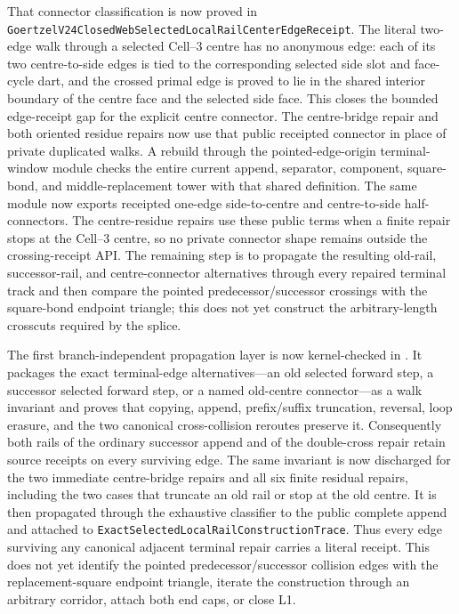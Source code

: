 \documentclass[11pt]{article}
\theoremstyle{definition}
\begin{document}
That connector classification is now proved in
\texttt{GoertzelV24ClosedWebSelectedLocalRailCenterEdgeReceipt}.  The literal
two-edge walk through a selected Cell--3 centre has no anonymous edge: each
of its two centre-to-side edges is tied to the corresponding selected side
slot and face-cycle dart, and the crossed primal edge is proved to lie in the
shared interior boundary of the centre face and the selected side face.  This
closes the bounded edge-receipt gap for the explicit centre connector.  The
centre-bridge repair and both oriented residue repairs now use that public
receipted connector in place of private duplicated walks.  A rebuild through
the pointed-edge-origin terminal-window module checks the entire current
append, separator, component, square-bond, and middle-replacement tower with
that shared definition.  The same module now exports receipted one-edge
side-to-centre and centre-to-side half-connectors.  The centre-residue repairs
use these public terms when a finite repair stops at the Cell--3 centre, so no
private connector shape remains outside the crossing-receipt API.  The
remaining step is to propagate the resulting old-rail, successor-rail, and
centre-connector alternatives through every repaired terminal track and then
compare the pointed predecessor/successor crossings with the square-bond
endpoint triangle; this does not yet construct the arbitrary-length crosscuts
required by the splice.

The first branch-independent propagation layer is now kernel-checked in
.
It packages the exact terminal-edge alternatives---an old selected forward
step, a successor selected forward step, or a named old-centre connector---as
a walk invariant and proves that copying, append, prefix/suffix truncation,
reversal, loop erasure, and the two canonical cross-collision reroutes
preserve it.  Consequently both rails of the ordinary successor append and
of the double-cross repair retain source receipts on every surviving edge.
The same invariant is now discharged for the two immediate centre-bridge
repairs and all six finite residual repairs, including the two cases that
truncate an old rail or stop at the old centre.  It is then propagated through
the exhaustive classifier to the public complete append and attached to
\texttt{ExactSelectedLocalRailConstructionTrace}.  Thus every edge surviving
any canonical adjacent terminal repair carries a literal receipt.  This does
not yet identify the pointed predecessor/successor collision edges with the
replacement-square endpoint triangle, iterate the construction through an
arbitrary corridor, attach both end caps, or close L1.
\end{document}
